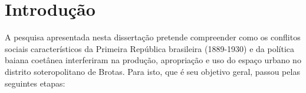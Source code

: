 \chapter[Introdução]{Introdução}\label{ch:intro}

A pesquisa apresentada nesta dissertação pretende compreender como os conflitos sociais característicos da Primeira República brasileira (1889-1930) e da política baiana coetânea interferiram na produção, apropriação e uso do espaço urbano no distrito soteropolitano de Brotas. Para isto, que é seu objetivo geral, passou pelas seguintes etapas:

